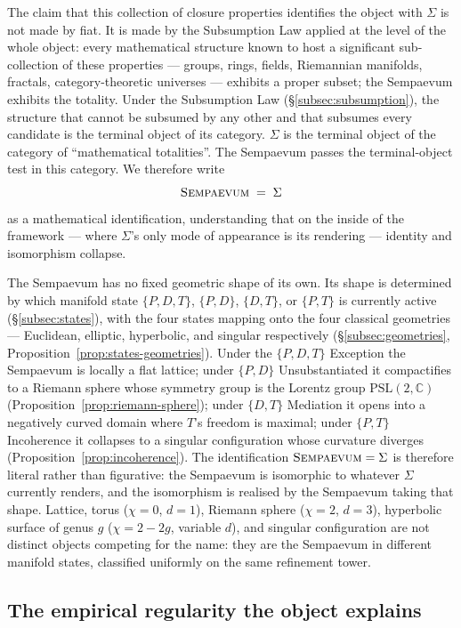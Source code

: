 \documentclass[11pt,a4paper]{article}
\theoremstyle{definition}
\theoremstyle{remark}
\newcommand{\C}{\mathbb{C}}
\newcommand{\Sempaevum}{\textsc{Sempaevum}}
\begin{document}
The claim that this collection of closure properties identifies the object with $\Sigma$ is not made by fiat. It is made by the Subsumption Law applied at the level of the whole object: every mathematical structure known to host a significant sub-collection of these properties --- groups, rings, fields, Riemannian manifolds, fractals, category-theoretic universes --- exhibits a proper subset; the Sempaevum exhibits the totality. Under the Subsumption Law (\S\ref{subsec:subsumption}), the structure that cannot be subsumed by any other and that subsumes every candidate is the terminal object of its category. $\Sigma$ is the terminal object of the category of ``mathematical totalities''. The Sempaevum passes the terminal-object test in this category. We therefore write
\[
\Sempaevum \;=\; \Sigma
\]
as a mathematical identification, understanding that on the inside of the framework --- where $\Sigma$'s only mode of appearance is its rendering --- identity and isomorphism collapse.

The Sempaevum has no fixed geometric shape of its own. Its shape is determined by which manifold state $\{P,D,T\}$, $\{P,D\}$, $\{D,T\}$, or $\{P,T\}$ is currently active (\S\ref{subsec:states}), with the four states mapping onto the four classical geometries --- Euclidean, elliptic, hyperbolic, and singular respectively (\S\ref{subsec:geometries}, Proposition~\ref{prop:states-geometries}). Under the $\{P,D,T\}$ Exception the Sempaevum is locally a flat lattice; under $\{P,D\}$ Unsubstantiated it compactifies to a Riemann sphere whose symmetry group is the Lorentz group $\mathrm{PSL}(2,\C)$ (Proposition~\ref{prop:riemann-sphere}); under $\{D,T\}$ Mediation it opens into a negatively curved domain where $T$'s freedom is maximal; under $\{P,T\}$ Incoherence it collapses to a singular configuration whose curvature diverges (Proposition~\ref{prop:incoherence}). The identification $\Sempaevum=\Sigma$ is therefore literal rather than figurative: the Sempaevum is isomorphic to whatever $\Sigma$ currently renders, and the isomorphism is realised by the Sempaevum taking that shape. Lattice, torus ($\chi=0$, $d=1$), Riemann sphere ($\chi=2$, $d=3$), hyperbolic surface of genus $g$ ($\chi=2-2g$, variable $d$), and singular configuration are not distinct objects competing for the name: they are the Sempaevum in different manifold states, classified uniformly on the same refinement tower.

\subsection{The empirical regularity the object explains}
\end{document}
